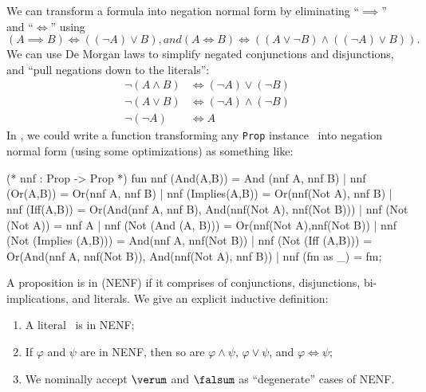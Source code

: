 \begin{node}
\begin{node}\label{prop-000R}%
We can transform a formula into negation normal form by eliminating
``$\implies$'' and ``$\iff$'' using
\begin{subequations}
\begin{equation}
(A\implies B) \iff ((\neg A)\lor B),
\end{equation}
and
\begin{equation}
(A\iff B)\iff((A\lor\neg B)\land((\neg A)\lor B)).
\end{equation}
\end{subequations}
We can use De Morgan laws to simplify negated conjunctions and
disjunctions, and ``pull negations down to the literals'':
\begin{subequations}
  \begin{align}
    \neg(A\land B) &\iff (\neg A)\lor(\neg B)\\
    \neg(A\lor B) &\iff (\neg A)\land(\neg B)\\
    \neg(\neg A) &\iff A
\end{align}
\end{subequations}
In \SML, we could write a function transforming any \verb|Prop|
instance~ into negation normal form (using some
optimizations) as something like:
\begin{sml}
(* nnf : Prop -> Prop *)
fun nnf (And(A,B)) = And (nnf A, nnf B)
  | nnf (Or(A,B)) = Or(nnf A, nnf B)
  | nnf (Implies(A,B)) = Or(nnf(Not A), nnf B)
  | nnf (Iff(A,B)) = Or(And(nnf A, nnf B),
                        And(nnf(Not A), nnf(Not B)))
  | nnf (Not (Not A)) = nnf A
  | nnf (Not (And (A, B))) = Or(nnf(Not A),nnf(Not B))
  | nnf (Not (Implies (A,B))) = And(nnf A, nnf(Not B))
  | nnf (Not (Iff (A,B))) = Or(And(nnf A, nnf(Not B)),
                               And(nnf(Not A), nnf B))
  | nnf (fm as _) = fm;
\end{sml}
\end{node}

\begin{definition}\label{prop-normal-form-0000}%
A proposition is in  (NENF) if
it comprises of conjunctions, disjunctions, bi-implications, and literals.
We give an explicit inductive definition:
\begin{enumerate}
\item A literal~ is in NENF;
\item If $\varphi$ and $\psi$ are in NENF, then so are
  $\varphi\land\psi$, $\varphi\lor\psi$, and $\varphi\iff\psi$;
\item We nominally accept $\verum$ and $\falsum$ as ``degenerate'' cases
  of NENF.
\end{enumerate}


\end{definition}
\end{node}
